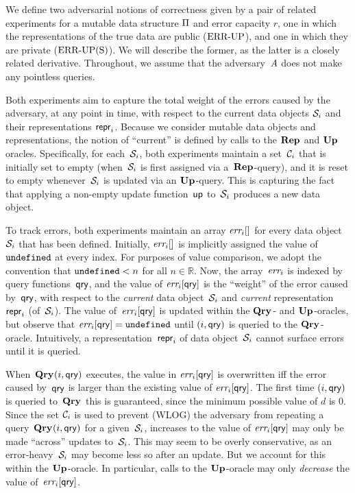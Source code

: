 
%
We define two adversarial notions of correctness given by a pair of related experiments for a mutable data structure $\mathrm{\Pi}$ and error capacity $r$, one in which the representations of the true data are public ($\textnormal{ERR\mbox{-}UP}$), and one in which they are private ($\textnormal{ERR\mbox{-}UP(S)}$).  We will describe the former, as the latter is a closely related derivative.  Throughout, we assume that the adversary~$\mathit{A}$ does not make any pointless queries. 

Both experiments aim to capture the total weight of the errors caused by the adversary, at any point in time, with respect to the current data objects $\mathcal{S}_i$ and their representations $\mathsf{repr}_i$.  Because we consider mutable data objects and representations, the notion of ``current'' is defined by calls to the $\mathbf{Rep}\hspace{0.5pt}$ and $\mathbf{Up}\hspace{0.5pt}$ oracles.  Specifically, for each~$\mathcal{S}_i$, both experiments maintain a set~$\mathcal{C}_i$ that is initially set to empty (when~$\mathcal{S}_i$ is first assigned via a~$\mathbf{Rep}\hspace{0.5pt}$-query), and it is reset to empty whenever~$\mathcal{S}_i$ is updated via an $\mathbf{Up}\hspace{0.5pt}$-query.  This is capturing the fact that applying a non-empty update function~$\mathsf{up}$ to~$\mathcal{S}_i$ produces a new data object.

To track errors, both experiments maintain an array $\textit{err}_i[]$ for every data object~$\mathcal{S}_i$ that has been defined.   Initially, $\textit{err}_i[]$ is implicitly assigned the value of~$\mathtt{undefined}$ at every index.  For purposes of value comparison, we adopt the convention that $\mathtt{undefined} < n$ for all $n \in \mathbb{R}$.
%
Now, the array~$\textit{err}_i$ is indexed by query functions~$\mathsf{qry}$, and the value of $\textit{err}_i[\mathsf{qry}]$ is the ``weight'' of the error caused by~$\mathsf{qry}$, with respect to the \emph{current} data object~$\mathcal{S}_i$ and \emph{current} representation~$\mathsf{repr}_i$ (of~$\mathcal{S}_i$).  
%
The value of~$\textit{err}_i[\mathsf{qry}]$ is updated within the $\mathbf{Qry}\hspace{0.5pt}$- and $\mathbf{Up}\hspace{0.5pt}$-oracles, but observe that $\textit{err}_i[\mathsf{qry}] = \mathtt{undefined}$ until $(i,\mathsf{qry})$ is queried to the $\mathbf{Qry}\hspace{0.5pt}$-oracle.  Intuitively, a representation~$\mathsf{repr}_i$ of data object~$\mathcal{S}_i$ cannot surface errors until it is queried.

When~$\mathbf{Qry}\hspace{0.5pt}(i,\mathsf{qry})$ executes, the value in $\textit{err}_i[\mathsf{qry}]$ is overwritten iff the error caused by~$\mathsf{qry}$ is larger than the existing value of $\textit{err}_i[\mathsf{qry}]$.  The first time $(i,\mathsf{qry})$ is queried to~$\mathbf{Qry}\hspace{0.5pt}$ this is guaranteed, since the minimum possible value of $d$ is 0.  Since the set $\mathcal{C}_i$ is used to prevent (WLOG) the adversary from repeating a query~$\mathbf{Qry}\hspace{0.5pt}(i,\mathsf{qry})$ for a given~$\mathcal{S}_i$, increases to the value of $\textit{err}_i[\mathsf{qry}]$ may only be made ``across'' updates to~$\mathcal{S}_i$.  This may seem to be overly conservative, as an error-heavy~$\mathcal{S}_i$ may become less so after an update.  But we account for this within the $\mathbf{Up}\hspace{0.5pt}$-oracle.
In particular, calls to the $\mathbf{Up}\hspace{0.5pt}$-oracle may only \emph{decrease} the value of~$\textit{err}_i[\mathsf{qry}]$.  

